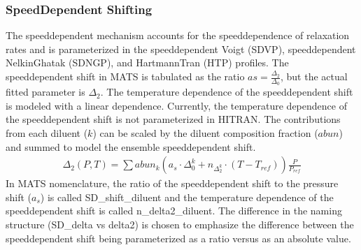 \documentclass[letterpaper,10pt,english]{sphinxmanual}
\begin{document}
\subsubsection{Speed\sphinxhyphen{}Dependent Shifting}
\label{\detokenize{MATS Summary:speed-dependent-shifting}}
\sphinxAtStartPar
The speed\sphinxhyphen{}dependent mechanism accounts for the speed\sphinxhyphen{}dependence of relaxation rates and is parameterized in the speed\sphinxhyphen{}dependent Voigt (SDVP), speed\sphinxhyphen{}dependent Nelkin\sphinxhyphen{}Ghatak (SDNGP), and Hartmann\sphinxhyphen{}Tran (HTP) profiles.  The speed\sphinxhyphen{}dependent shift in MATS is tabulated as the ratio \(a{s} = \frac{\Delta_{2}}{\Delta_{0}}\), but the actual fitted parameter is \(\Delta_{2}\).  The temperature dependence of the speed\sphinxhyphen{}dependent shift is modeled with a linear dependence.  Currently, the temperature dependence of the speed\sphinxhyphen{}dependent shift is not parameterized in HITRAN.  The contributions from each diluent (\(k\)) can be scaled by the diluent composition fraction (\(abun\)) and summed to model the ensemble speed\sphinxhyphen{}dependent shift.
\begin{equation*}
\begin{split}\Delta_{2} (P,T) = \sum abun_{k} (a_{s} \cdot \Delta_{0}^{k} +  n_{\Delta_{2}^{k}}\cdot (T - T_{ref}) )\frac{P}{P_{ref}}\end{split}
\end{equation*}
\sphinxAtStartPar
In MATS nomenclature, the ratio of the speed\sphinxhyphen{}dependent shift to the pressure shift (\(a_{s}\)) is called SD\_shift\_diluent and the temperature dependence of the speed\sphinxhyphen{}dependent shift is called n\_delta2\_diluent.  The difference in the naming structure (SD\_delta vs delta2) is chosen to emphasize the difference between the speed\sphinxhyphen{}dependent shift being parameterized as a ratio versus as an absolute value.
\end{document}
